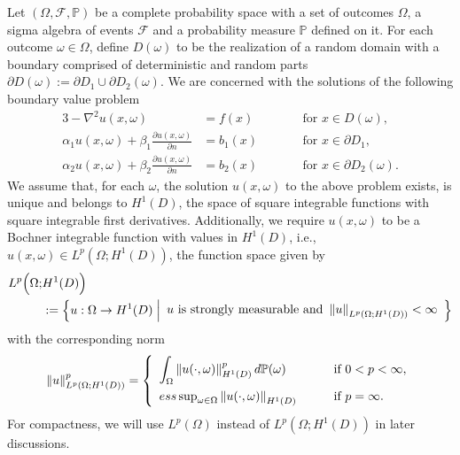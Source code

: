 Let $(\Omega,\mathcal{F},\mathbb{P})$ be a complete probability space with a set of outcomes $\Omega$, a sigma algebra of events $\mathcal{F}$ and a probability measure $\mathbb{P}$ defined on it.
For each outcome $\omega \in \Omega$, define $D(\omega)$ to be the realization of a random domain with a boundary comprised of deterministic and random parts $\partial D(\omega):=\partial D_1 \cup \partial D_2(\omega)$.
We are concerned with the solutions of the following boundary value problem
\begin{alignat}{3} \label{eq:Poisson}
	\nonumber
	-\nabla^2 u(x,\omega)                                                    &= f(x)   &\qquad &\text{for } x \in D(\omega),
	\\ 
	\alpha_1 u(x,\omega) + \beta_1 \frac{\partial u(x,\omega)}{\partial n}   &= b_1(x)        &\qquad &\text{for } x \in \partial D_1,
	\\ \nonumber
	\alpha_2 u(x,\omega) + \beta_2 \frac{\partial u(x,\omega)}{\partial n}   &= b_2(x) &\qquad &\text{for } x \in \partial D_2(\omega).
\end{alignat}
We assume that, for each $\omega$, the solution $u(x,\omega)$ to the above problem exists, is unique and belongs to $H^1(D)$, the space of square integrable functions with square integrable first derivatives.
Additionally, we require $u({x},\omega)$ to be a Bochner integrable function with values in $H^1(D)$, i.e., $u({x}, \omega) \in L^p(\Omega; H^1(D))$, the function space given by
\begin{align*}
	L^p \Big( \Omega;&H^1(D) \Big) 
	\\ 
	&:=\left\{
	u : \Omega \to H^1(D) \; \Big| 
	\begin{array}{l}
		u \text{ is strongly measurable and } \left\| u \right\|_{{L^p(\Omega;H^1(D))}} < \infty	
	\end{array}		
	\right\}
\end{align*}
with the corresponding norm
\begin{align}\label{eq:rand_norm}
	\left\| u \right\|_{L^p(\Omega;H^1(D))}^p = 
	\left\{
		\begin{array}{l l}
			\displaystyle{ \int_{\Omega}  \left\|  u(\cdot,\omega)  \right\|_{H^1(D)} ^p d \mathbb{P}(\omega) } &\qquad \text{if  } 0 < p < \infty,
			\\[1em]
			ess \sup_{\omega \in \Omega} \left\|  u(\cdot,\omega)  \right\|_{H^1(D)} &\qquad \text{if  } p=\infty.
		\end{array}
	\right.
\end{align}
For compactness, we will use $L^p(\Omega)$ instead of $L^p(\Omega; H^1(D))$ in later discussions. 

